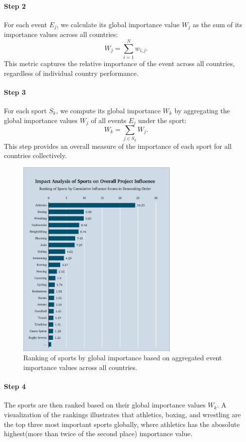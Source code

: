 \documentclass{mcmthesis}
\begin{document}
\paragraph{Step 2}
For each event $E_j$, we calculate its global importance value $W_j$ as the sum of its importance values across all countries:
\[
W_j = \sum_{i=1}^N w_{i,j}.
\]
This metric captures the relative importance of the event across all countries, regardless of individual country performance.

\paragraph{Step 3}
For each sport $S_k$, we compute its global importance $W_k$ by aggregating the global importance values $W_j$ of all events $E_j$ under the sport:
\[
W_k = \sum_{j \in S_k} W_j.
\]
This step provides an overall measure of the importance of each sport for all countries collectively.

\newpage

\begin{figure}  %
    \centering
    \includegraphics[width=0.9\linewidth,height=10cm]{pics/sport_influence_whole.png}
    \caption{Ranking of sports by global importance based on aggregated event importance values across all countries.}
    \label{fig:sport_importance}
\end{figure}



\paragraph{Step 4}
The sports are then ranked based on their global importance values $W_k$. A visualization of the rankings illustrates that athletics, boxing, and wrestling are the top three most important sports globally, where athletics has the abosolute highest(more than twice of the second place) importance value.
\end{document}

